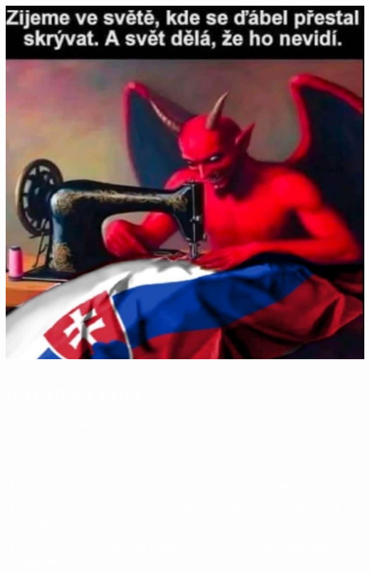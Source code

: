 \documentclass{article}
\begin{document}
\begin{yellowbox}
  \begin{minipage}{0.27\textwidth}
    \includegraphics[width=\linewidth]{dulezite.jpg}
  \end{minipage}
  \hfill
  \begin{minipage}{0.7\textwidth}
    \vspace{-5pt}
    \textcolor{white}{
    \subsection*{KAVÁRNA POLE}
    Po--Pá: 8--22 hod $\bullet$ So, Ne: 9--22 hod
    \small
    \begin{itemize}[leftmargin=10pt]
      \item z nám. 28. října jeď jednu zastávku šalinou na Dětskou nemocnici, pak je to za rohem
      \item značka kávy: \textbf{Vescovi} (italská rodinná značka) a \textbf{Mamacoffee} (z Prahy)
      \item mají od všeho něco: solidní výběr \textbf{snídaní}, \textbf{panini} i sladkých \textbf{domácích dezertů}
      \item obsluha doporučuje \textbf{olivový bagel}, naše redakce zase \textbf{zapečený toust s vejcemi}
    \end{itemize}
    }
  \end{minipage}
\end{yellowbox}
\end{document}
